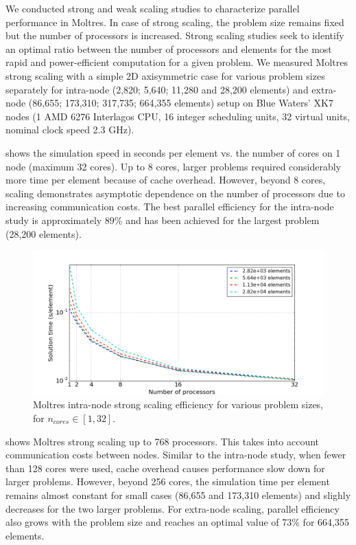 \documentclass{article}
\makeatletter
\def\maxwidth#1{\ifdim\Gin@nat@width>#1 #1\else\Gin@nat@width\fi}
\makeatother
\begin{document}
We conducted strong and weak scaling studies to characterize parallel 
performance in Moltres.
In case of strong scaling, the problem size remains fixed but the number of
processors is increased. Strong scaling studies seek to identify an
optimal ratio between the number of processors and elements for the most
rapid and power-efficient computation for a given problem. We measured
Moltres strong scaling with a simple 2D axisymmetric
case for various problem sizes separately for intra-node (2,820; 5,640;
11,280 and 28,200 elements) and extra-node (86,655; 173,310; 317,735;
664,355 elements) setup on Blue Waters' XK7 nodes (1 AMD 6276 Interlagos 
CPU, 16 integer scheduling units, 32 virtual units, nominal clock speed
2.3 GHz). 

 shows the simulation speed in seconds
per element vs. the number of cores on 1 node (maximum 32 cores). Up to 8 
cores, larger problems required considerably more time per
element because of cache overhead. However, beyond 8 cores, scaling demonstrates
asymptotic dependence on the number of processors due to increasing
communication costs. The best parallel efficiency for the intra-node study
is approximately 89\% and has been achieved for the largest problem
(28,200 elements). 

\begin{figure}[htpb]
  \centering
  \includegraphics[width=\maxwidth{\textwidth}]{intra-node_strong.png}
  \caption{Moltres intra-node strong scaling efficiency for various problem 
        sizes, for $n_{cores} \in [1,32]$.}
  \label{fig:intra_strong_scaling}
\end{figure}

 shows Moltres strong scaling up to 768
processors. This takes into account communication costs between nodes.
Similar to the intra-node study, when fewer than 128 cores were used, 
cache overhead causes performance slow down for larger problems. However, 
beyond 256 cores, the simulation time per element remains almost constant for small cases (86,655 and
173,310 elements) and slighly decreases for the two larger problems.
For extra-node scaling, parallel efficiency also grows with the
problem size and reaches an optimal value of 73\% for 664,355 elements.
\end{document}
